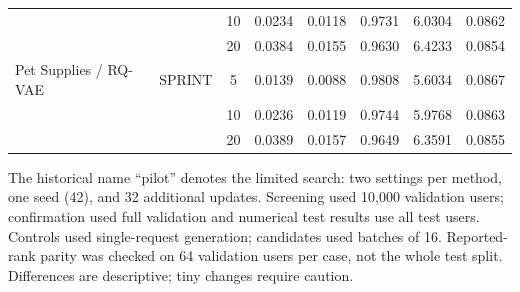 \begin{table}[p]
\begin{tabular}{llcccccc}
 &  & 10 & 0.0234 & 0.0118 & 0.9731 & 6.0304 & 0.0862 \\
 &  & 20 & 0.0384 & 0.0155 & 0.9630 & 6.4233 & 0.0854 \\
Pet Supplies / RQ-VAE & SPRINT & 5 & 0.0139 & 0.0088 & 0.9808 & 5.6034 & 0.0867 \\
 &  & 10 & 0.0236 & 0.0119 & 0.9744 & 5.9768 & 0.0863 \\
 &  & 20 & 0.0389 & 0.0157 & 0.9649 & 6.3591 & 0.0855 \\
\bottomrule
\end{tabular}
\par\smallskip\footnotesize The historical name ``pilot'' denotes the limited search: two settings per method, one seed (42), and 32 additional updates. Screening used 10,000 validation users; confirmation used full validation and numerical test results use all test users. Controls used single-request generation; candidates used batches of 16. Reported-rank parity was checked on 64 validation users per case, not the whole test split. Differences are descriptive; tiny changes require caution.
\end{table}

